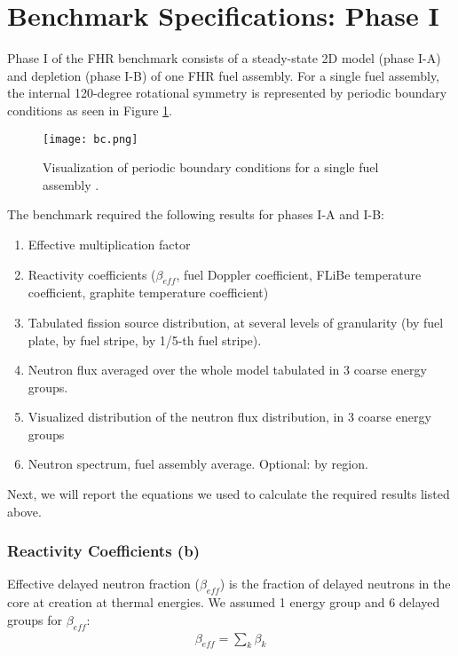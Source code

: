 \section{Benchmark Specifications: Phase I}
\label{sec:phase1}
Phase I of the \gls{FHR} benchmark consists of a steady-state 2D model 
(phase I-A) and depletion (phase I-B) of one \gls{FHR} fuel assembly. 
For a single fuel assembly, the internal 120-degree rotational symmetry is 
represented by periodic boundary conditions as seen in Figure \ref{fig:bc}. 
\begin{figure}[]
    \centering
    \texttt{[image: bc.png]} 
    \caption{Visualization of periodic boundary conditions for a single fuel 
    assembly \cite{noauthor_fluoride_nodate}.}
    \label{fig:bc}
\end{figure}
The benchmark required the following results for phases I-A and I-B:
\begin{enumerate}[label=(\alph*)]
    \item Effective multiplication factor 
    \item Reactivity coefficients ($\beta_{eff}$, fuel Doppler coefficient, FLiBe 
    temperature coefficient, graphite temperature coefficient)
    \item Tabulated fission source distribution, at several levels of granularity 
    (by fuel plate, by fuel stripe, by 1/5-th fuel stripe). 
    \item Neutron flux averaged over the whole model tabulated in 3 coarse energy groups. 
    \item Visualized distribution of the neutron flux distribution, in 3 coarse energy groups
    \item Neutron spectrum, fuel assembly average. Optional: by region.
\end{enumerate}

Next, we will report the equations we used to calculate the required results 
listed above. 

\subsubsection{Reactivity Coefficients (b)}
Effective delayed neutron fraction ($\beta_{eff}$) is the fraction of delayed 
neutrons in the core at creation at thermal energies. 
We assumed 1 energy group and 6 delayed groups for $\beta_{eff}$: 
\begin{align}
    \beta_{eff} = \sum_k \beta_k
\end{align}

